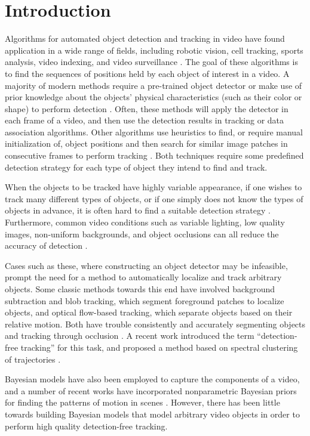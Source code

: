 \documentclass{article}
\begin{document}
\section{Introduction}
Algorithms for automated object detection and tracking in video have found application in a wide range of fields, including robotic vision, cell tracking, sports analysis, video indexing, and video surveillance \cite{turaga2008machine,yilmaz2006object}. 
The goal of these algorithms is to find the sequences of positions held by each object of interest in a video. A majority of modern methods require a pre-trained object detector or make use of prior knowledge about the objects' physical characteristics (such as their color or shape) to perform detection \cite{breitenstein2009robust}. Often, these methods will apply the detector in each frame of a video, and then use the detection results in tracking or data association algorithms. Other algorithms use heuristics to find, or require manual initialization of, object positions and then search for similar image patches in consecutive frames to perform tracking \cite{meer2003kernel}. Both techniques require some predefined detection strategy for each type of object they intend to find and track.

When the objects to be tracked have highly variable appearance, if one wishes to track many different types of objects, or if one simply does not know the types of objects in advance, it is often hard to find a suitable detection strategy \cite{babenko2011robust}. Furthermore, common video conditions such as variable lighting, low quality images, non-uniform backgrounds, and object occlusions can all reduce the accuracy of detection \cite{wu2007cluster}.

Cases such as these, where constructing an object detector may be infeasible, prompt the need for a method to automatically localize and track arbitrary objects. 
Some classic methods towards this end have involved background subtraction and blob tracking, which segment foreground patches to localize objects, and optical flow-based tracking, which separate objects based on their relative motion. Both have trouble consistently and accurately segmenting objects and tracking through occlusion \cite{veeraraghavan2006robust,barron1994performance}.
A recent work introduced the term ``detection-free tracking'' for this task, and proposed a method based on spectral clustering of trajectories \cite{fragkiadaki2011detection}.

Bayesian models have also been employed to capture the components of a video, and a number of recent works have incorporated nonparametric Bayesian priors for finding the patterns of motion in scenes \cite{wang2007unsupervised,emonet2011extracting}. However, there has been little towards building Bayesian models that model arbitrary video objects in order to perform high quality detection-free tracking.
\end{document}

